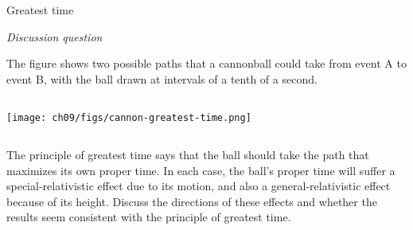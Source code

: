 \begin{frame}{Greatest time}

\emph{Discussion question}

      The figure shows two possible paths that a cannonball could take from event A to event B, with the
      ball drawn at intervals of a tenth of a second.

  \begin{mycolumns}

    \begin{column}{.3\textwidth}\texttt{[image: ch09/figs/cannon-greatest-time.png]}\end{column}

    \begin{column}{.7\textwidth}

      The principle of greatest time says that the ball should take the path that maximizes its own proper time.
      In each case, the ball's proper time will suffer a special-relativistic effect due to its motion,
      and also a general-relativistic effect because of its height.
      Discuss the directions of these effects and whether the results seem consistent with the principle of
      greatest time.

    \end{column}
  \end{mycolumns}

\end{frame}

